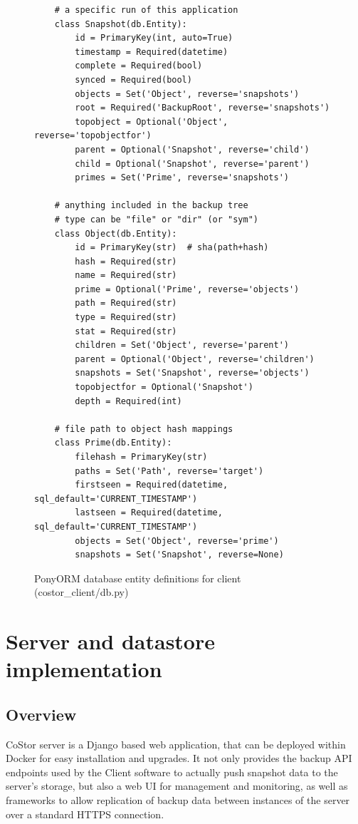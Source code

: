 \documentclass[bsc,frontabs,twoside,singlespacing,parskip,deptreport]{infthesis}     %
\begin{document}
\begin{figure}
	\begin{verbatim}
    # a specific run of this application
    class Snapshot(db.Entity):
        id = PrimaryKey(int, auto=True)
        timestamp = Required(datetime)
        complete = Required(bool)
        synced = Required(bool)
        objects = Set('Object', reverse='snapshots')
        root = Required('BackupRoot', reverse='snapshots')
        topobject = Optional('Object', reverse='topobjectfor')
        parent = Optional('Snapshot', reverse='child')
        child = Optional('Snapshot', reverse='parent')
        primes = Set('Prime', reverse='snapshots')
    
    # anything included in the backup tree
    # type can be "file" or "dir" (or "sym")
    class Object(db.Entity):
        id = PrimaryKey(str)  # sha(path+hash)
        hash = Required(str)
        name = Required(str)
        prime = Optional('Prime', reverse='objects')
        path = Required(str)
        type = Required(str)
        stat = Required(str)
        children = Set('Object', reverse='parent')
        parent = Optional('Object', reverse='children')
        snapshots = Set('Snapshot', reverse='objects')
        topobjectfor = Optional('Snapshot')
        depth = Required(int)

    # file path to object hash mappings
    class Prime(db.Entity):
        filehash = PrimaryKey(str)
        paths = Set('Path', reverse='target')
        firstseen = Required(datetime, sql_default='CURRENT_TIMESTAMP')
        lastseen = Required(datetime, sql_default='CURRENT_TIMESTAMP')
        objects = Set('Object', reverse='prime')
        snapshots = Set('Snapshot', reverse=None)
	\end{verbatim}
	\caption{PonyORM database entity definitions for client (costor\_client/db.py)}
	\label{fig:clientmodels}
\end{figure}

\chapter{Server and datastore implementation}

\section{Overview}

CoStor server is a Django based web application, that can be deployed within Docker for easy
installation and upgrades. It not only provides the backup API endpoints used by the Client
software to actually push snapshot data to the server's storage, but also a web UI for 
management and monitoring, as well as frameworks to allow replication of backup data between
instances of the server over a standard HTTPS connection.
\end{document}
